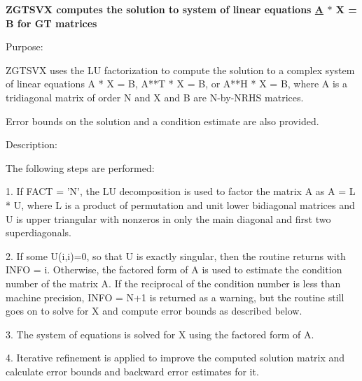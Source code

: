 {\bfseries  Z\+G\+T\+S\+V\+X computes the solution to system of linear equations \hyperlink{classA}{A} $\ast$ X = B for G\+T matrices {\bfseries  }}

 \begin{DoxyParagraph}{Purpose\+: }
\begin{DoxyVerb} ZGTSVX uses the LU factorization to compute the solution to a complex
 system of linear equations A * X = B, A**T * X = B, or A**H * X = B,
 where A is a tridiagonal matrix of order N and X and B are N-by-NRHS
 matrices.

 Error bounds on the solution and a condition estimate are also
 provided.\end{DoxyVerb}
 
\end{DoxyParagraph}
\begin{DoxyParagraph}{Description\+: }
\begin{DoxyVerb} The following steps are performed:

 1. If FACT = 'N', the LU decomposition is used to factor the matrix A
    as A = L * U, where L is a product of permutation and unit lower
    bidiagonal matrices and U is upper triangular with nonzeros in
    only the main diagonal and first two superdiagonals.

 2. If some U(i,i)=0, so that U is exactly singular, then the routine
    returns with INFO = i. Otherwise, the factored form of A is used
    to estimate the condition number of the matrix A.  If the
    reciprocal of the condition number is less than machine precision,
    INFO = N+1 is returned as a warning, but the routine still goes on
    to solve for X and compute error bounds as described below.

 3. The system of equations is solved for X using the factored form
    of A.

 4. Iterative refinement is applied to improve the computed solution
    matrix and calculate error bounds and backward error estimates
    for it.\end{DoxyVerb}
 
\end{DoxyParagraph}

